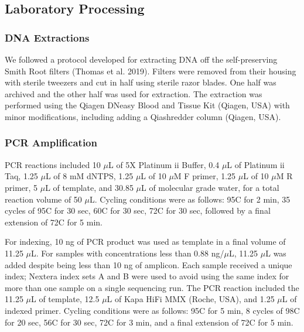 \documentclass[
]{article}
\begin{document}
\hypertarget{laboratory-processing}{%
\subsection{Laboratory Processing}\label{laboratory-processing}}

\hypertarget{dna-extractions}{%
\subsubsection{DNA Extractions}\label{dna-extractions}}

We followed a protocol developed for extracting DNA off the
self-preserving Smith Root filters (Thomas et al. 2019). Filters were
removed from their housing with sterile tweezers and cut in half using
sterile razor blades. One half was archived and the other half was used
for extraction. The extraction was performed using the Qiagen DNeasy
Blood and Tissue Kit (Qiagen, USA) with minor modifications, including
adding a Qiashredder column (Qiagen, USA).

\hypertarget{pcr-amplification}{%
\subsubsection{PCR Amplification}\label{pcr-amplification}}

PCR reactions included 10 \(\mu\)L of 5X Platinum ii Buffer, 0.4
\(\mu\)L of Platinum ii Taq, 1.25 \(\mu\)L of 8 mM dNTPS, 1.25 \(\mu\)L
of 10 \(\mu\)M F primer, 1.25 \(\mu\)L of 10 \(\mu\)M R primer, 5
\(\mu\)L of template, and 30.85 \(\mu\)L of molecular grade water, for a
total reaction volume of 50 \(\mu\)L. Cycling conditions were as
follows: 95\degree C for 2 min, 35 cycles of 95\degree C for 30 sec,
60\degree C for 30 sec, 72\degree C for 30 sec, followed by a final
extension of 72\degree C for 5 min.

For indexing, 10 ng of PCR product was used as template in a final
volume of 11.25 \(\mu\)L. For samples with concentrations less than 0.88
ng/\(\mu\)L, 11.25 \(\mu\)L was added despite being less than 10 ng of
amplicon. Each sample received a unique index; Nextera index sets A and
B were used to avoid using the same index for more than one sample on a
single sequencing run. The PCR reaction included the 11.25 \(\mu\)L of
template, 12.5 \(\mu\)L of Kapa HiFi MMX (Roche, USA), and 1.25 \(\mu\)L
of indexed primer. Cycling conditions were as follows: 95\degree C for 5
min, 8 cycles of 98\degree C for 20 sec, 56\degree C for 30 sec,
72\degree C for 3 min, and a final extension of 72\degree C for 5 min.
\end{document}

